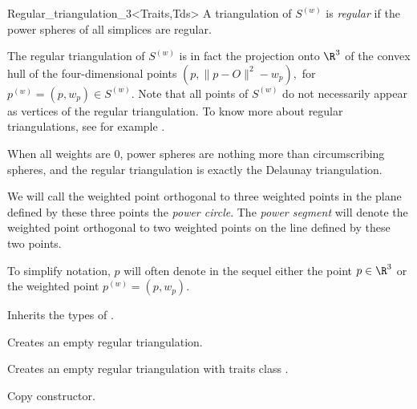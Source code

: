 \begin{ccClassTemplate}{Regular_triangulation_3<Traits,Tds>}
A triangulation of ${S}^{(w)}$ is \textit{regular} if the power spheres
of all simplices are regular. 

The regular triangulation of
${S}^{(w)}$ is in fact the projection onto $\R^3$ of the convex hull 
of the four-dimensional points $(p,\|p-O\|^2-w_p),$ for
${p}^{(w)}=(p,w_p)\in{S}^{(w)}$. 
Note that all points of ${S}^{(w)}$ do not
necessarily appear as vertices of the regular
triangulation. To know more about regular triangulations, see for
example \cite{es-itfwr-96}. 

When all weights are 0, power spheres are nothing more than
circumscribing spheres, and the regular triangulation is exactly the
Delaunay triangulation.

We will call the weighted point orthogonal to three weighted points in
the plane defined by these three points the \textit{power circle}. The
\textit{power segment} will denote the weighted point orthogonal to
two weighted points on the line defined by these two points.

To simplify notation, $p$ will often denote in the sequel either the
point $p\in\R^3$ or the weighted point ${p}^{(w)}=(p,w_p)$.




\ccTypes
{}

Inherits the types of .

\ccGlue
{}

\ccCreation
{}

{Creates an empty regular triangulation.}

{Creates an empty regular triangulation with traits class
.}

{Copy constructor.}

\ccModifiers



\end{ccClassTemplate}
